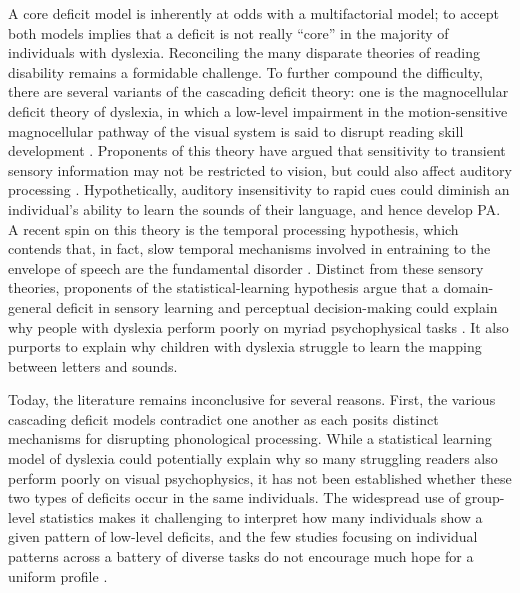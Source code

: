 \documentclass[../uwthesis.tex]{subfiles}
\begin{document}
A core deficit model is inherently at odds with a multifactorial model; to accept both models implies that a deficit is not really “core” in the majority of individuals with dyslexia. Reconciling the many disparate theories of reading disability remains a formidable challenge. To further compound the difficulty, there are several variants of the cascading deficit theory: one is the magnocellular deficit theory of dyslexia, in which a low-level impairment in the motion-sensitive magnocellular pathway of the visual system is said to disrupt reading skill development \cite{Stein2001TheDyslexia,Stein2018TheDyslexia,Stein1997ToDyslexia}. Proponents of this theory have argued that sensitivity to transient sensory information may not be restricted to vision, but could also affect auditory processing 
\cite{Stein1999ImpairedHypothesis,VanIngelghem2001,Witton1998}. Hypothetically, auditory insensitivity to rapid cues could diminish an individual’s ability to learn the sounds of their language, and hence develop PA. A recent spin on this theory is the temporal processing hypothesis, which contends that, in fact, slow temporal mechanisms involved in entraining to the envelope of speech are the fundamental disorder \cite{Casini2018ItsDyslexia,Goswami2015SensoryResearch,Huss2011}. Distinct from these sensory theories, proponents of the statistical-learning hypothesis argue that a domain-general deficit in sensory learning and perceptual decision-making could explain why people with dyslexia perform poorly on myriad psychophysical tasks  \cite{Ahissar2007,Nicolson2018ProceduralCommitment,Ziegler2008}. It also purports to explain why children with dyslexia struggle to learn the mapping between letters and sounds.

Today, the literature remains inconclusive for several reasons. First, the various cascading deficit models contradict one another as each posits distinct mechanisms for disrupting phonological processing. While a statistical learning model of dyslexia could potentially explain why so many struggling readers also perform poorly on visual psychophysics, it has not been established whether these two types of deficits occur in the same individuals. The widespread use of group-level statistics makes it challenging to interpret how many individuals show a given pattern of low-level deficits, and the few studies focusing on individual patterns across a battery of diverse tasks do not encourage much hope for a uniform profile \cite{Amitay2002,Ho2002TheDyslexia.,Menghini2010DevelopmentalMemory.,Ramus2003,White2006}.
\end{document}
